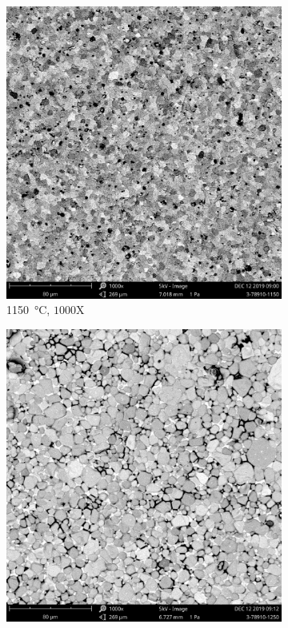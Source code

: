 \documentclass[UTF8,no-math]{ctexart}
\numberwithin{enumi}{section}
\begin{document}
\begin{enumerate}
\begin{figure}[htbp]
\begin{subfigure}[b]{0.27\textwidth}
            \end{subfigure}
            \begin{subfigure}[b]{0.27\textwidth}
                \centering
                \includegraphics[width=0.9\linewidth]{fig/3-78910-11500001.jpg}
                \caption{\SI{1150}{\celsius}, $1000\text{X}$}
            \end{subfigure}
            \begin{subfigure}[b]{0.27\textwidth}
                \centering
                \includegraphics[width=0.9\linewidth]{fig/3-78910-12500001.jpg}

\end{subfigure}
\end{figure}
\end{enumerate}
\end{document}

